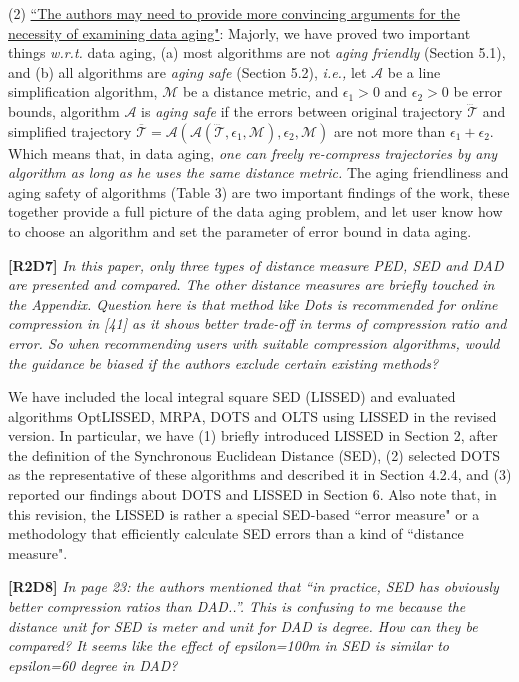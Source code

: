 \documentclass{letter}
\newcommand{\ie}{\emph{i.e.,}\xspace}
\newcommand{\wrt}{\emph{w.r.t.}\xspace}
\begin{document}
{(2) \underline{``The authors may need to provide more convincing arguments for the necessity of examining data aging"}: Majorly, we have proved two important things \wrt data aging, (a) most algorithms are not \emph{aging friendly} (Section 5.1), and (b) all algorithms are \emph{aging safe} (Section 5.2), \ie let $\mathcal{A}$ be a line simplification algorithm,  $\mathcal{M}$ be a distance metric, and $\epsilon_1>0$ and $\epsilon_2>0$ be error bounds, algorithm $\mathcal{A}$ is \emph{aging safe} if the errors between original trajectory $\dddot{\mathcal{T}}$ and simplified trajectory $\overline{\mathcal{T}}=\mathcal{A}(\mathcal{A}(\dddot{\mathcal{T}}, \epsilon_1, \mathcal{M}), \epsilon_2, \mathcal{M})$ are not more than $\epsilon_1+ \epsilon_2$. Which means that, in data aging, \emph{one can freely re-compress trajectories by any algorithm as long as he uses the same distance metric.} The aging friendliness and aging safety of algorithms (Table 3) are two important findings of the work, these together provide a full picture of the data aging problem, and let user know how to choose an algorithm and set the parameter of error bound in data aging. 


\textbf{[R2D7]} \emph{In this paper, only three types of distance measure PED, SED and DAD are presented and compared. The other distance measures are briefly touched in the Appendix. Question here is that method like Dots is recommended for online compression in [41] as it shows better trade-off in terms of compression ratio and error. So when recommending users with suitable compression algorithms, would the guidance be biased if the authors exclude certain existing methods?}

We have included the local integral square SED (LISSED) and evaluated algorithms OptLISSED, MRPA, DOTS and OLTS using LISSED in the revised version. In particular, we have (1) briefly introduced LISSED in Section 2, after the definition of the Synchronous Euclidean Distance (SED), (2) selected DOTS as the representative of these algorithms and described it in Section 4.2.4, and (3) reported our findings about DOTS and LISSED in Section 6.
Also note that, in this revision, {the LISSED is rather a special SED-based ``error measure" or a methodology that efficiently calculate SED errors than a kind of ``distance measure"}.

\textbf{[R2D8]} \emph{In page 23: the authors mentioned that “in practice, SED has obviously better compression ratios than DAD..”. This is confusing to me because the distance unit for SED is meter and unit for DAD is degree. How can they be compared? It seems like the effect of epsilon=100m in SED is similar to epsilon=60 degree in DAD?}

}
\end{document}
